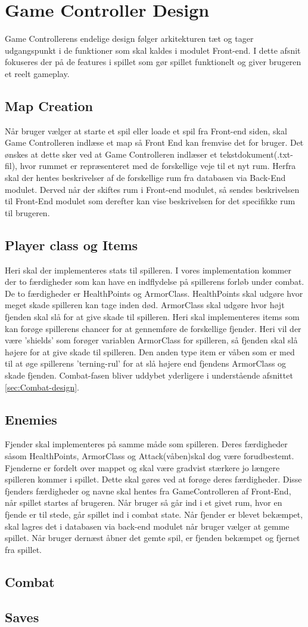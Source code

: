\section{Game Controller Design}
Game Controllerens endelige design følger arkitekturen tæt og tager udgangspunkt i de funktioner som skal kaldes i modulet Front-end. I dette afsnit fokuseres der på de features i spillet som gør spillet funktionelt og giver brugeren et reelt gameplay.

\subsection{Map Creation}
Når bruger vælger at starte et spil eller loade et spil fra Front-end siden, skal Game Controlleren indlæse et map så Front End kan fremvise det for bruger. Det ønskes at dette sker ved at Game Controlleren indlæser et tekstdokument(.txt-fil), hvor rummet er repræsenteret med de forskellige veje til et nyt rum. Herfra skal der hentes beskrivelser af de forskellige rum fra databasen via Back-End modulet. Derved når der skiftes rum i Front-end modulet, så sendes beskrivelsen til Front-End modulet som derefter kan vise beskrivelsen for det specifikke rum til brugeren.

\subsection{Player class og Items}
Heri skal der implementeres stats til spilleren. I vores implementation kommer der to færdigheder som kan have en indflydelse på spillerens forløb under combat. De to færdigheder er HealthPoints og ArmorClass. HealthPoints skal udgøre hvor meget skade spilleren kan tage inden død. ArmorClass skal udgøre hvor højt fjenden skal slå for at give skade til spilleren. Heri skal implementeres items som kan forøge spillerens chancer for at gennemføre de forskellige fjender. Heri vil der være 'shields' som forøger variablen ArmorClass for spilleren, så fjenden skal slå højere for at give skade til spilleren. Den anden type item er våben som er med til at øge spillerens 'terning-rul' for at slå højere end fjendens ArmorClass og skade fjenden. Combat-fasen bliver uddybet yderligere i understående afsnittet \autoref{sec:Combat-design}.

\subsection{Enemies}
Fjender skal implementeres på samme måde som spilleren. Deres færdigheder såsom HealthPoints, ArmorClass og Attack(våben)skal dog være forudbestemt. Fjenderne er fordelt over mappet og skal være gradvist stærkere jo længere spilleren kommer i spillet. Dette skal gøres ved at forøge deres færdigheder. Disse fjenders færdigheder og navne skal hentes fra GameControlleren af Front-End, når spillet startes af brugeren. Når bruger så går ind i et givet rum, hvor en fjende er til stede, går spillet ind i combat state. Når fjender er blevet bekæmpet, skal lagres det i databasen via back-end modulet når bruger vælger at gemme spillet. Når bruger dernæst åbner det gemte spil, er fjenden bekæmpet og fjernet fra spillet.
\subsection{Combat}
\label{sec:Combat-design}


\subsection{Saves}